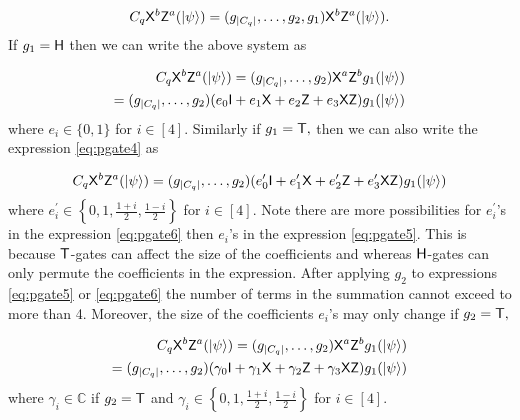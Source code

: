 \begin{equation}
\label{eq:pgate4}
C_q {\sf X}^b{\sf Z}^a ({\lvert}\psi\rangle)=(g_{|C_q|},\ldots,g_2,g_1 ){\sf X}^b{\sf Z}^a ({\lvert}\psi\rangle).
\end{equation}
If $g_1={\sf H}$ then we can write the above system as 

\begin{equation}
\begin{aligned}
\label{eq:pgate5}
C_q {\sf X}^b{\sf Z}^a ({\lvert}\psi\rangle)=(g_{|C_q|},\ldots,g_2)  {\sf X}^a {\sf Z}^b g_1 ({\lvert}\psi\rangle) \\
=(g_{|C_q|},\ldots,g_2)(e_0 {\sf I} +  e_1 {\sf X} + e_2 {\sf Z} + e_3{\sf X} {\sf Z})g_1 ({\lvert}\psi\rangle)
\end{aligned}
\end{equation}
where  $e_i \in \{0,1\}$ for $i\in[4].$ Similarly if $g_1={\sf T},$ then we can also write the expression \ref{eq:pgate4} as 

\begin{equation}
\begin{aligned}
\label{eq:pgate6}
C_q {\sf X}^b{\sf Z}^a ({\lvert}\psi\rangle)=(g_{|C_q|},\ldots,g_2)(e_0^\prime {\sf I} +  e_1^\prime {\sf X} + e_2^\prime {\sf Z} + e_3^\prime {\sf X} {\sf Z})g_1 ({\lvert}\psi\rangle)
\end{aligned}
\end{equation}
where $e_i^\prime \in\left\{0,1, \frac{1+i}{2}, \frac{1-i}{2}\right\}$  for $i\in[4].$ Note there are more possibilities for $e_i^\prime$'s in the expression \ref{eq:pgate6} then $e_i$'s in the expression \ref{eq:pgate5}. This is because ${\sf T}$-gates can affect the size of the coefficients and whereas ${\sf H}$-gates can only permute the coefficients in the expression. After applying $g_2$ to expressions \ref{eq:pgate5} or \ref{eq:pgate6} the number of terms in the summation cannot exceed to more than 4. Moreover, the size of the coefficients $e_i$'s may only change if $g_2={\sf T},$ 

\begin{equation}
\begin{aligned}
\label{eq:pgate7}
C_q {\sf X}^b{\sf Z}^a ({\lvert}\psi\rangle)=(g_{|C_q|},\ldots,g_2)  {\sf X}^a {\sf Z}^b g_1 ({\lvert}\psi\rangle)\\
=(g_{|C_q|},\ldots,g_2)(\gamma_0 {\sf I} +  \gamma_1 {\sf X} + \gamma_2 {\sf Z} + \gamma_3 {\sf X} {\sf Z})g_1 ({\lvert}\psi\rangle)
\end{aligned}
\end{equation}
where $\gamma_i \in \mathbb{C}$ if $g_2={\sf T}$ and $\gamma_i  \in\left\{0,1, \frac{1+i}{2}, \frac{1-i}{2}\right\}$ for $i\in[4].$

